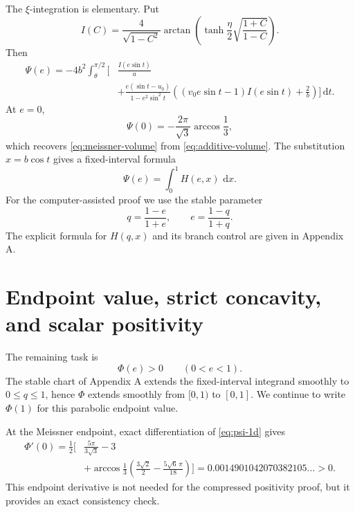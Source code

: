 \documentclass[11pt]{article}
\numberwithin{equation}{section}
\theoremstyle{remark}
\newcommand{\dd}{\,\mathrm d}
\begin{document}
The \(\xi\)-integration is elementary. Put
\begin{equation}
  I(C)=\frac{4}{\sqrt{1-C^2}}
  \arctan\left(
  \tanh\frac\eta2\sqrt{\frac{1+C}{1-C}}
  \right).
  \label{eq:I}
\end{equation}
Then
\begin{equation}
\begin{aligned}
  \Psi(e)=-4b^2\int_\theta^{\pi/2}
  \bigg[&\frac{I(e\sin t)}a\\
  &+\frac{e(\sin t-u_0)}{1-e^2\sin^2t}
  \left((v_0e\sin t-1)I(e\sin t)+\frac2b\right)
  \bigg]\dd t.
\end{aligned}
\label{eq:psi-1d}
\end{equation}
At \(e=0\),
\begin{equation}
  \Psi(0)=-\frac{2\pi}{\sqrt3}\arccos\frac13,
  \label{eq:psi-zero}
\end{equation}
which recovers \eqref{eq:meissner-volume} from \eqref{eq:additive-volume}. The substitution \(x=b\cos t\) gives a fixed-interval formula
\begin{equation}
  \Psi(e)=\int_0^1H(e,x)\,\dd x.
  \label{eq:fixed-H}
\end{equation}
For the computer-assisted proof we use the stable parameter
\begin{equation}
  q=\frac{1-e}{1+e},
  \qquad
  e=\frac{1-q}{1+q}.
  \label{eq:q}
\end{equation}
The explicit formula for \(H(q,x)\) and its branch control are given in Appendix A.

\section{Endpoint value, strict concavity, and scalar positivity}
\label{sec:certificate}

The remaining task is
\begin{equation}
  \Phi(e)>0\qquad(0<e<1).
  \label{eq:target}
\end{equation}
The stable chart of Appendix A extends the fixed-interval integrand smoothly to
\(0\le q\le1\), hence \(\Phi\) extends smoothly from \([0,1)\) to \([0,1]\).
We continue to write \(\Phi(1)\) for this parabolic endpoint value.

At the Meissner endpoint, exact differentiation of \eqref{eq:psi-1d} gives
\begin{equation}
\begin{aligned}
  \Phi'(0)=\frac12\bigg[&\frac{5\pi}{3\sqrt3}-3\\
  &+\arccos\frac13
  \left(\frac{3\sqrt2}{2}-\frac{5\sqrt6\,\pi}{18}\right)
  \bigg]
  =0.0014901042070382105\ldots>0.
\end{aligned}
\label{eq:phi-prime-zero}
\end{equation}
This endpoint derivative is not needed for the compressed positivity proof, but it provides an exact consistency check.
\end{document}
